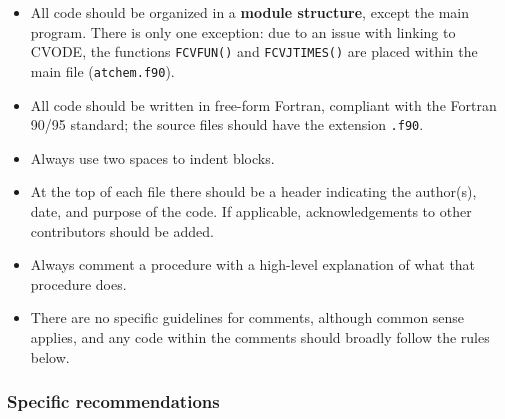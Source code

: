 \begin{itemize}
\item All code should be organized in a \textbf{module structure},
  except the main program. There is only one exception: due to an
  issue with linking to CVODE, the functions \texttt{FCVFUN()} and
  \texttt{FCVJTIMES()} are placed within the main file
  (\texttt{atchem.f90}).
\item All code should be written in free-form Fortran, compliant with
  the Fortran 90/95 standard; the source files should have the
  extension \texttt{.f90}.
\item Always use two spaces to indent blocks.
\item At the top of each file there should be a header indicating the
  author(s), date, and purpose of the code. If applicable,
  acknowledgements to other contributors should be added.
\item Always comment a procedure with a high-level explanation of what
  that procedure does.
\item There are no specific guidelines for comments, although common
  sense applies, and any code within the comments should broadly
  follow the rules below.
\end{itemize}

\subsubsection{Specific recommendations}

